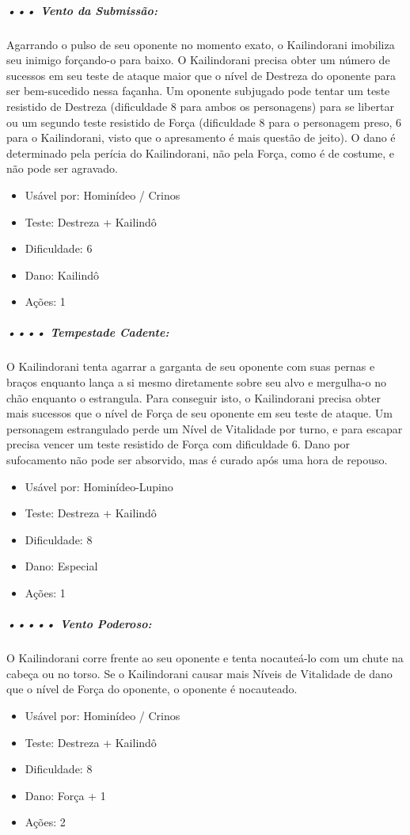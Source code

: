 \subparagraph{\bf ••• Vento da Submissão:}
Agarrando o pulso de seu oponente no momento exato, o Kailindorani imobiliza seu inimigo forçando-o para baixo. O Kailindorani precisa obter um número de sucessos em seu teste de ataque maior que o nível de Destreza do oponente para ser bem-sucedido nessa façanha. Um oponente subjugado pode tentar um teste resistido de Destreza (dificuldade 8 para ambos os personagens) para se libertar ou um segundo teste resistido de Força (dificuldade 8 para o personagem preso, 6 para o Kailindorani, visto que o apresamento é mais questão de jeito). O dano é determinado pela perícia do Kailindorani, não pela Força, como é de costume, e não pode ser agravado. 
\begin{itemize}[noitemsep]
\item Usável por: Hominídeo / Crinos
\item Teste: Destreza + Kailindô 
\item Dificuldade: 6
\item Dano: Kailindô
\item Ações: 1
\end{itemize}

\subparagraph{\bf •••• Tempestade Cadente:}
O Kailindorani tenta agarrar a garganta de seu oponente com suas pernas e braços enquanto lança a si mesmo diretamente sobre seu alvo e mergulha-o no chão enquanto o estrangula. Para conseguir isto, o Kailindorani precisa obter mais sucessos que o nível de Força de seu oponente em seu teste de ataque. Um personagem estrangulado perde um Nível de Vitalidade por turno, e para escapar precisa vencer um teste resistido de Força com dificuldade 6. Dano por sufocamento não pode ser absorvido, mas é curado após uma hora de repouso.
\begin{itemize}[noitemsep]
\item Usável por: Hominídeo-Lupino
\item Teste: Destreza + Kailindô 
\item Dificuldade: 8
\item Dano: Especial
\item Ações: 1
\end{itemize}

\subparagraph{\bf ••••• Vento Poderoso:}
O Kailindorani corre frente ao seu oponente e tenta nocauteá-lo com um chute na cabeça ou no torso. Se o Kailindorani causar mais Níveis de Vitalidade de dano que o nível de Força do oponente, o oponente é nocauteado.
\begin{itemize}[noitemsep]
\item Usável por: Hominídeo / Crinos
\item Teste: Destreza + Kailindô
\item Dificuldade: 8
\item Dano: Força + 1 
\item Ações: 2
\end{itemize}

